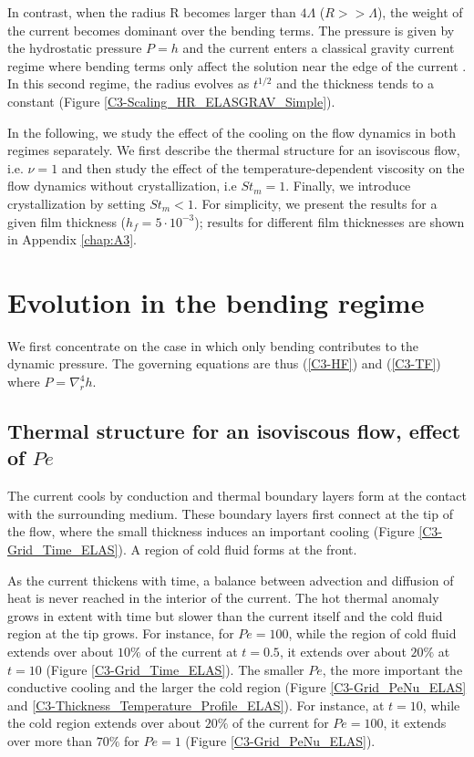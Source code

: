 In  contrast,  when  the  radius  R  becomes  larger  than  $4\Lambda$
($R>>\Lambda$), the  weight of the  current becomes dominant  over the
bending  terms.  The  pressure is  given by  the hydrostatic  pressure
$P =  h$ and  the current  enters a  classical gravity  current regime
where bending  terms only  affect the  solution near  the edge  of the
current  \citep{Huppert:1982a,Michaut:2011kg,Lister:2013ia}.  In  this
second regime, the radius evolves as $t^{1/2}$ and the thickness tends
to a constant (Figure \ref{C3-Scaling_HR_ELASGRAV_Simple}).

In  the following,  we study  the effect  of the  cooling on  the flow
dynamics in  both regimes  separately. We  first describe  the thermal
structure  for an  isoviscous flow,  i.e. $\nu=1$  and then  study the
effect  of the  temperature-dependent viscosity  on the  flow dynamics
without  crystallization,  i.e  $St_m   =1$.   Finally,  we  introduce
crystallization by  setting $St_m<1$.  For simplicity,  we present the
results for a given  film thickness ($h_f=5\cdot10^{-3}$); results for
different film thicknesses are shown in Appendix \ref{chap:A3}.

\section{Evolution in the bending regime}
\label{C3-sec:evol-bend-regime}

We first concentrate on the case  in which only bending contributes to
the dynamic pressure.  The  governing equations are thus (\ref{C3-HF})
and (\ref{C3-TF}) where $P=\nabla_r^4h$.

\subsection{Thermal structure for an isoviscous flow, effect of $Pe$}
\label{C3-sec:thermal-structure-an}

The current  cools by conduction  and thermal boundary layers  form at
the contact with the surrounding  medium.  These boundary layers first
connect at the  tip of the flow, where the  small thickness induces an
important cooling (Figure \ref{C3-Grid_Time_ELAS}).   A region of cold
fluid forms at the front.

As the  current thickens  with time, a  balance between  advection and
diffusion of heat is never reached in the interior of the current. The
hot thermal  anomaly grows  in extent  with time  but slower  than the
current  itself and  the  cold fluid  region at  the  tip grows.   For
instance, for $Pe  =100$, while the region of cold  fluid extends over
about $10\%$ of  the current at $t=0.5$, it extends  over about $20\%$
at $t  =10$ (Figure  \ref{C3-Grid_Time_ELAS}).  The smaller  $Pe$, the
more important the  conductive cooling and the larger  the cold region
(Figure                   \ref{C3-Grid_PeNu_ELAS}                  and
\ref{C3-Thickness_Temperature_Profile_ELAS}).    For    instance,   at
$t=10$, while the cold region extends over about $20\%$ of the current
for  $Pe=100$, it  extends over  more than  $70\%$ for  $Pe=1$ (Figure
\ref{C3-Grid_PeNu_ELAS}).

